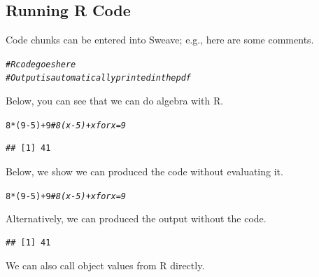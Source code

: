 \documentclass{article}\usepackage[]{graphicx}\usepackage[]{xcolor}
\makeatletter
\newcommand{\hlnum}[1]{\textcolor[rgb]{0.686,0.059,0.569}{#1}}%
\newcommand{\hlcom}[1]{\textcolor[rgb]{0.678,0.584,0.686}{\textit{#1}}}%
\newcommand{\hlopt}[1]{\textcolor[rgb]{0,0,0}{#1}}%
\newcommand{\hldef}[1]{\textcolor[rgb]{0.345,0.345,0.345}{#1}}%
\newenvironment{kframe}{%
 \def\at@end@of@kframe{}%
 \ifinner\ifhmode%
  \def\at@end@of@kframe{\end{minipage}}%
  \begin{minipage}{\columnwidth}%
 \fi\fi%
 \def\FrameCommand##1{\hskip\@totalleftmargin \hskip-\fboxsep
 \colorbox{shadecolor}{##1}\hskip-\fboxsep
     \hskip-\linewidth \hskip-\@totalleftmargin \hskip\columnwidth}%
 \MakeFramed {\advance\hsize-\width
   \@totalleftmargin\z@ \linewidth\hsize
   \@setminipage}}%
 {\par\unskip\endMakeFramed%
 \at@end@of@kframe}
\newenvironment{knitrout}{}{} %
\makeatother
\begin{document}
\begin{multicols}{2}
\subsection{Running R Code}
Code chunks can be entered into Sweave; e.g., here are some
comments.
\begin{knitrout}\scriptsize
{}\color{fgcolor}\begin{kframe}
\begin{alltt}
\hlcom{# R code goes here}
\hlcom{# Output is automatically printed in the pdf}
\end{alltt}
\end{kframe}
\end{knitrout}
  Below, you can see that we can do algebra with R.
\begin{knitrout}\scriptsize
{}\color{fgcolor}\begin{kframe}
\begin{alltt}
\hlnum{8}\hlopt{*}\hldef{(}\hlnum{9}\hlopt{-}\hlnum{5}\hldef{)} \hlopt{+} \hlnum{9}   \hlcom{# 8(x-5) + x for x=9}
\end{alltt}
\begin{verbatim}
## [1] 41
\end{verbatim}
\end{kframe}
\end{knitrout}
  Below, we show we can produced the code without evaluating
it. 
\begin{knitrout}\scriptsize
{}\color{fgcolor}\begin{kframe}
\begin{alltt}
\hlnum{8}\hlopt{*}\hldef{(}\hlnum{9}\hlopt{-}\hlnum{5}\hldef{)} \hlopt{+} \hlnum{9}   \hlcom{# 8(x-5) + x for x=9}
\end{alltt}
\end{kframe}
\end{knitrout}
  Alternatively, we can produced the output without the
code.
\begin{knitrout}\scriptsize
{}\color{fgcolor}\begin{kframe}
\begin{verbatim}
## [1] 41
\end{verbatim}
\end{kframe}
\end{knitrout}
  We can also call object values from R directly.
\begin{knitrout}\scriptsize

\end{knitrout}
\end{multicols}
\end{document}
